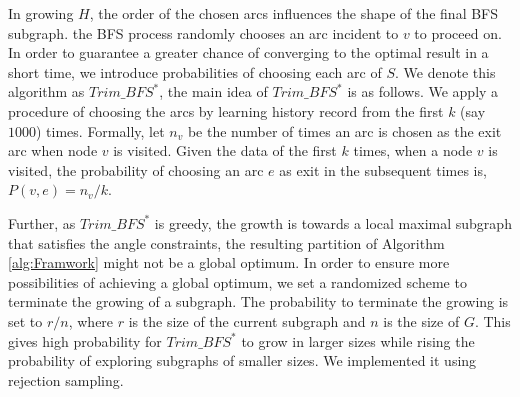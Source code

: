 In growing $H$, the order of the chosen arcs influences the shape of the final BFS subgraph. the BFS process randomly chooses an arc incident to $v$ to proceed on. In order to guarantee a greater chance of converging to the optimal result in a short time, we introduce probabilities of choosing each arc of $S$. We denote this algorithm as \textbf{$Trim\_BFS^*$}, the main idea of $Trim\_BFS^*$ is as follows.
We apply a procedure of choosing the arcs by learning history record from the first $k$ (say $1000$) times. Formally, let $n_v$ be the number of times an arc is chosen as the exit arc when node $v$ is visited. Given the data of the first $k$ times, when a node $v$ is visited, the probability of choosing an arc $e$ as exit in the subsequent times is, $P(v, e) = n_v/k$.


Further, as $Trim\_BFS^*$ is greedy, the growth is towards a local maximal subgraph that satisfies the angle constraints, the resulting partition of Algorithm \ref{alg:Framwork} might not be a global optimum. In order to ensure more possibilities of achieving a global optimum, we set a randomized scheme to terminate the growing of a subgraph. The probability to terminate the growing is set to $r/n$, where $r$ is the size of the current subgraph and $n$ is the size of $G$. This gives high probability for $Trim\_BFS^*$ to grow in larger sizes while rising the probability of exploring subgraphs of smaller sizes. We implemented it using rejection sampling.

